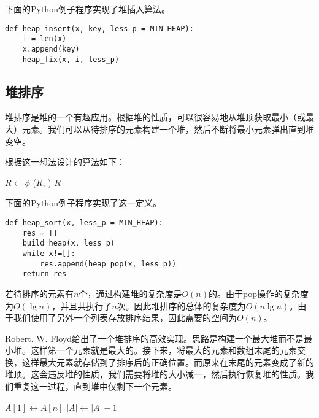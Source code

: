 \documentclass[UTF8]{article}
\begin{document}
下面的Python例子程序实现了堆插入算法。

\lstset{language=Python}
\begin{lstlisting}
def heap_insert(x, key, less_p = MIN_HEAP):
    i = len(x)
    x.append(key)
    heap_fix(x, i, less_p)
\end{lstlisting}

\subsection{堆排序}
\label{heap-sort}

堆排序是堆的一个有趣应用。根据堆的性质，可以很容易地从堆顶获取最小（或最大）元素。我们可以从待排序的元素构建一个堆，然后不断将最小元素弹出直到堆变空。

根据这一想法设计的算法如下：

\begin{algorithmic}[1]
  \State $R \gets \phi$
  \State {}
    \State {}($R$, )
  \EndWhile
  \State \Return $R$
\EndFunction
\end{algorithmic}

下面的Python例子程序实现了这一定义。

\lstset{language=Python}
\begin{lstlisting}
def heap_sort(x, less_p = MIN_HEAP):
    res = []
    build_heap(x, less_p)
    while x!=[]:
        res.append(heap_pop(x, less_p))
    return res
\end{lstlisting}

若待排序的元素有$n$个，通过构建堆的复杂度是$O(n)$的。由于pop操作的复杂度为$O(\lg n)$，并且共执行了$n$次。因此堆排序的总体的复杂度为$O(n \lg n)$。由于我们使用了另外一个列表存放排序结果，因此需要的空间为$O(n)$。

Robert. W. Floyd给出了一个堆排序的高效实现。思路是构建一个最大堆而不是最小堆。这样第一个元素就是最大的。接下来，将最大的元素和数组末尾的元素交换，这样最大元素就存储到了排序后的正确位置。而原来在末尾的元素变成了新的堆顶。这会违反堆的性质，我们需要将堆的大小减一，然后执行恢复堆的性质。我们重复这一过程，直到堆中仅剩下一个元素。

\begin{algorithmic}[1]
  \State {}
    \State {} $A[1] \leftrightarrow A[n]$
    \State $|A| \gets |A| - 1$
    \State {}
  \EndWhile
\EndFunction
\end{algorithmic}
\end{document}

